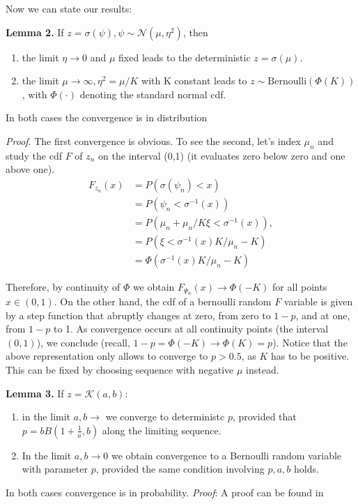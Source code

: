 \documentclass[twoside]{article}
\begin{document}
Now we can state our results:

\textbf{Lemma 2.} If $z=\sigma(\psi),\psi\sim\mathcal{N}(\mu,\eta^2)$, then
\begin{enumerate} \item the  limit $\eta\rightarrow 0$ and $\mu$ fixed leads to the deterministic $z=\sigma(\mu)$. 
\item the limit $\mu\rightarrow \infty, \eta^2=\mu/K$ with K constant leads to $z\sim \text{Bernoulli}(\Phi(K))$, with $\Phi(\cdot)$ denoting the standard normal cdf.
\end{enumerate} In both cases the convergence is in distribution 

\textit{Proof}. The first convergence is obvious. To see the second, let's index $\mu_n$ and  study the cdf $F$ of $z_n$ on the interval (0,1) (it evaluates zero below zero and one above one).
\begin{align}F_{z_n}(x)&= P(\sigma(\psi_n)<x) \\
&=P(\psi_n< \sigma^{-1}(x))\\
&=P(\mu_n +\mu_n/K\xi <\sigma^{-1}(x)),\\\
&= P( \xi <\sigma^{-1}(x)K/\mu_n - K)\\
&= \Phi( \sigma^{-1}(x)K/\mu_n - K) 
\end{align}

Therefore, by continuity of $\Phi$ we obtain $F_{\Psi_n}(x)\rightarrow \Phi(-K)$ for all points $x\in(0,1)$. On the other hand, the cdf of a bernoulli random $F$ variable is given by  a step function that abruptly changes at zero, from zero to $1-p$, and at one, from $1-p$ to 1. As convergence occurs at all continuity points (the interval $(0,1)$), we conclude (recall, $1-p= \Phi(-K)\rightarrow \Phi(K)=p$). Notice that the above representation only allows  to converge to $p>0.5$, as $K$ has to be positive. This can be fixed by choosing sequence with negative $\mu$ instead.

\textbf{Lemma 3.} If $z=\mathcal{K}(a,b)$: \begin{enumerate}
\item in the limit $a,b \rightarrow $  we converge to deterministc $p$, provided that $p=bB\left(1+\frac{1}{a},b\right)$ along the limiting sequence.
\item In the limit $a,b\rightarrow 0$ we obtain convergence to a Bernoulli random variable with parameter $p$, provided the same condition involving $p,a,b$ holds. 
\end{enumerate}
In both cases convergence is in probability.
\textit{Proof}: A proof can be found in \cite{mitnik2013kumar}
\end{document}
